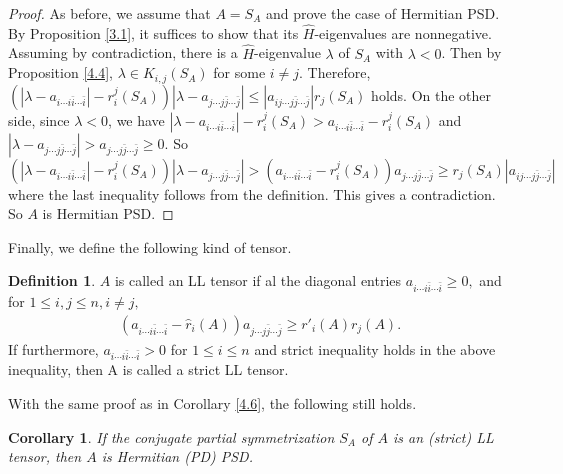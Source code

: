 \documentclass[10pt,reqno]{amsart}
\newtheorem{cor}[thm]{Corollary}
\theoremstyle{definition}
\newtheorem{defn}[thm]{Definition}
\begin{document}
	\begin{proof}
	As before, we assume that $A=S_A$ and prove the case of Hermitian PSD. By Proposition \ref{3.1}, it suffices to show that its $\hat{H}$-eigenvalues are nonnegative. Assuming by contradiction, there is a $\hat{H}$-eigenvalue $\lambda$ of $S_A$ with $\lambda< 0$. Then by Proposition \ref{4.4}, $\lambda\in K_{i,j}(S_A)$ for some $i\neq j$. Therefore, $(|\lambda -a_{i\cdots i\bar{i}\cdots\bar{i}}|-r_{i}^{j}(S_A))|\lambda-a_{j\cdots j\bar{j}\cdots\bar{j}}|\leq |a_{ij\cdots j\bar{j}\cdots \bar{j}}|r_{j}(S_A)$ holds. On the other side, since $\lambda< 0$, we have $|\lambda -a_{i\cdots i\bar{i}\cdots\bar{i}}|-r_{i}^{j}(S_A)>a_{i\cdots i\bar{i}\cdots\bar{i}}-r_{i}^{j}(S_A)$ and $|\lambda-a_{j\cdots j\bar{j}\cdots\bar{j}}|> a_{j\cdots j\bar{j}\cdots\bar{j}}\geq 0$. So $$(|\lambda -a_{i\cdots i\bar{i}\cdots\bar{i}}|-r_{i}^{j}(S_A))|\lambda-a_{j\cdots j\bar{j}\cdots\bar{j}}|> (a_{i\cdots i\bar{i}\cdots\bar{i}}-r_{i}^{j}(S_A))a_{j\cdots j\bar{j}\cdots\bar{j}}\geq r_{j}(S_A)|a_{ij\cdots j\bar{j}\cdots \bar{j}}|$$ where the last inequality follows from the definition. This gives a contradiction. So $A$ is Hermitian PSD.
	\end{proof}
	Finally, we define the following kind of tensor.
\begin{defn}
$A$ is called an LL tensor if al the diagonal entries $a_{i\cdots i\bar{i}\cdots\bar{i}}\geq0,$ and for $1\leq i,j\leq n, i\neq j,$
	\begin{align} (a_{i\cdots i\bar{i}\cdots\bar{i}}-\hat{r}_{i}(A))a_{j\cdots j\bar{j}\cdots\bar{j}}\geq r'_{i}(A)r_{j}(A).\label{4.13} \end{align}
	If furthermore, $a_{i\cdots i\bar{i}\cdots\bar{i}}>0$ for $1\leq i\leq n$ and strict inequality holds in the above inequality, then A is called a strict LL tensor.
\end{defn}
With the same proof as in Corollary \ref{4.6}, the following still holds. 
	\begin{cor}
	If the conjugate partial symmetrization $S_A$ of $A$ is an (strict) LL tensor, then $A$ is Hermitian (PD) PSD.
	\end{cor}
	
\end{document}
